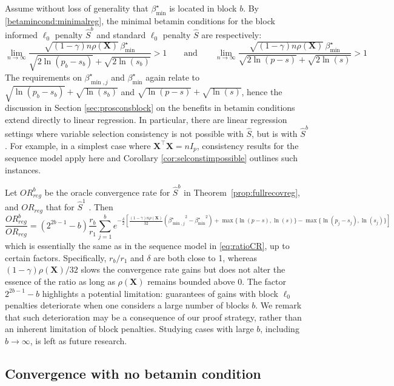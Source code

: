 \documentclass[aos]{imsart}
\theoremstyle{plain}
\newcommand{\bs}{\boldsymbol}
\begin{document}
Assume without loss of generality that $\beta_{\min}^{\star}$ is located in block $b$.  By \eqref{betamincond:minimalreg}, the minimal betamin conditions for the block informed $\ell_0$ penalty $\hat{S}^b$ and standard $\ell_0$ penalty $\hat{S}$ are respectively: 
$$\lim_{n\to \infty}\frac{\sqrt{(1-\gamma) n\rho(\bs X)}\,{\beta_{\min}^{\star}}}{\sqrt{2\ln(p_b-s_b)} + \sqrt{2\ln(s_b)}} >1 \qquad \mbox{and} \qquad \lim_{n\to \infty}\frac{\sqrt{(1-\gamma) n\rho(\bs X)}\,{\beta_{\min}^{\star}}}{\sqrt{2\ln(p-s)} + \sqrt{2\ln(s)}} >1$$
The requirements on $\beta_{\min,j}^\star$ and $\beta_{\min}^\star$ again relate to
$\sqrt{\ln(p_b-s_b)} + \sqrt{\ln(s_b)}$ and $\sqrt{\ln(p-s)} + \sqrt{\ln(s)}$, hence the discussion in Section \ref{sec:prosconsblock} on the benefits in betamin conditions extend directly to linear regression.
In particular, there are linear regression settings where variable selection consistency is not possible with $\hat{S}$, but is with $\hat{S}^b$. For example, in a simplest case where $\bs X^\top \bs X=n I_p$, consistency results for the sequence model apply here
and Corollary \ref{cor:selconstimpossible} outlines such instances.

Let ${OR}^b_{reg}$ be the oracle convergence rate for $\hat{S}^{b}$ in Theorem~\ref{prop:fullrecovreg}, and ${OR}_{reg}$ that for $\hat{S}^{1}$ . Then
\begin{equation*}
    \frac{{OR}^b_{reg}}{{OR}_{reg}}=(2^{2b-1}-b)\frac{r_b}{r_1}\sum_{j=1}^be^{-\frac{\delta}{2}\left[\frac{(1-\gamma) n\rho(\bs X)}{32}\left({\beta^\star_{\min,j}}^2-{\beta_{\min}^\star}^2\right)+\max\{\ln(p-s),\ln(s)\}-\max\{\ln(p_j-s_j),\ln(s_j)\}\right]}
\end{equation*}
which is essentially the same as in the sequence model
in \eqref{eq:ratioCR}, up to certain
factors. 
Specifically, $r_b/r_1$ and $\delta$ are both close to 1, whereas $(1-\gamma) \rho(\bs X)/32$ slows the convergence rate gains
but does not alter the essence of the ratio
as long as $\rho(\bs X)$ remains bounded above 0. The factor $2^{2b-1}-b$ highlights a potential limitation: guarantees of gains with block $\ell_0$ penalties deteriorate when one considers a large number of blocks $b$.
We remark that such deterioration may be a consequence of our proof strategy, rather than an inherent limitation of block penalties. Studying cases with large $b$, including $b \to \infty$, is left as future research.

\subsection{Convergence with no betamin condition}\label{ssec:nobetaminhyp}
\end{document}
